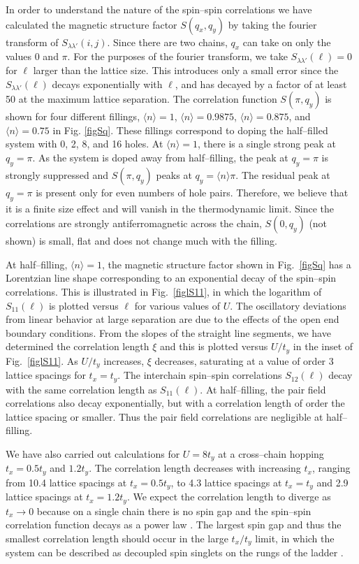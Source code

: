 In order to understand the nature of the spin--spin correlations
we have calculated the magnetic structure factor $S(q_x,q_y)$ by
taking the fourier transform of $S_{\lambda\lambda '}(i,j)$.
Since there are two chains, $q_x$ can take on only the values $0$
and $\pi$.
For the purposes of the fourier transform, we take
$S_{\lambda\lambda'}(\ell) = 0$ for $\ell$ larger than the lattice
size.
This introduces only a small error since the
$S_{\lambda\lambda'}(\ell)$ decays exponentially with $\ell$, and has
decayed by a factor of at least 50 at the maximum lattice separation.
The correlation function $S(\pi,q_y)$ is shown for four different
fillings, $\langle n \rangle = 1$, $\langle n \rangle = 0.9875$,
$\langle n \rangle = 0.875$, and
$\langle n \rangle = 0.75$ in Fig. \ref{figSq}.
These fillings correspond to doping the half--filled system with 0, 2,
8, and 16 holes.
At $\langle n \rangle = 1$, there is a single strong peak at $q_y=\pi$.
As the system is doped away from half--filling, the peak at $q_y=\pi$
is strongly suppressed and $S(\pi,q_y)$ peaks at
$q_y = \langle n \rangle \pi$.
The residual peak at $q_y = \pi$ is present only for even numbers of
hole pairs.
Therefore, we believe that it is a finite size effect and will
vanish in the thermodynamic limit.
Since the correlations are strongly antiferromagnetic across the
chain, $S(0,q_y)$ (not shown) is small, flat and does not change much
with the filling.

At half--filling, $\langle n \rangle =1$, the magnetic structure
factor shown in Fig.\ \ref{figSq} has a Lorentzian line shape
corresponding to an exponential decay of the spin--spin correlations.
This is illustrated in Fig.\ \ref{figlS11}, in which the logarithm of
$S_{11}(\ell)$ is plotted versus $\ell$ for various values of $U$.
The oscillatory deviations from linear behavior at large separation
are due to the effects of the open end boundary conditions.
{}From the slopes of the straight line segments, we have determined the
correlation length $\xi$ and this is plotted versus $U/t_y$ in the
inset of Fig.\ \ref{figlS11}.
As $U/t_y$ increases, $\xi$ decreases, saturating at a value of order 3
lattice spacings for $t_x = t_y$.
The interchain spin--spin correlations $S_{12}(\ell)$ decay
with the same correlation length as $S_{11}(\ell)$.
At half--filling, the pair field correlations also decay
exponentially, but with a correlation length
of order the lattice spacing or smaller.
Thus the pair field correlations are negligible at half--filling.

We have also carried out calculations for $U=8t_y$ at a cross--chain
hopping $t_x=0.5t_y$ and $1.2t_y$.
The correlation length decreases with increasing $t_x$,
ranging from 10.4 lattice spacings at $t_x=0.5t_y$, to 4.3 lattice
spacings at $t_x=t_y$ and 2.9 lattice
spacings at $t_x=1.2t_y$.
We expect the correlation length to diverge as $t_x \rightarrow 0$
because on a single chain there is no spin gap and the spin--spin
correlation function decays as a power law \cite{schulz}.
The largest spin gap and thus the smallest correlation length should
occur in the large $t_x/t_y$ limit, in which
the system can be described as decoupled spin singlets on the rungs of
the ladder \cite{dagotto}.

